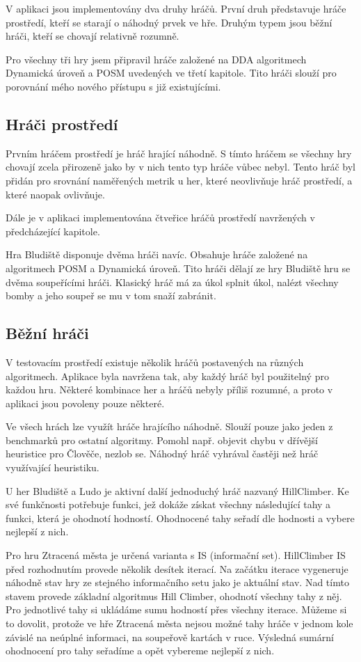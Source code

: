 V aplikaci jsou implementovány dva druhy hráčů. První druh představuje hráče prostředí, kteří se starají o náhodný prvek ve hře. Druhým typem jsou běžní hráči, kteří se chovají relativně rozumně.

Pro všechny tři hry jsem připravil hráče založené na DDA algoritmech Dynamická úroveň a POSM uvedených ve třetí kapitole. Tito hráči slouží pro porovnání mého nového přístupu s již existujícími.

\subsection{Hráči prostředí}

Prvním hráčem prostředí je hráč hrající náhodně. S tímto hráčem se všechny hry chovají zcela přirozeně jako by v nich tento typ hráče vůbec nebyl. Tento hráč byl přidán pro srovnání naměřených metrik u her, které neovlivňuje hráč prostředí, a které naopak ovlivňuje.

Dále je v aplikaci implementována čtveřice hráčů prostředí navržených v předcházející kapitole.

Hra Bludiště disponuje dvěma hráči navíc. Obsahuje hráče založené na algoritmech POSM a Dynamická úroveň. Tito hráči dělají ze hry Bludiště hru se dvěma soupeřícími hráči. Klasický hráč má za úkol splnit úkol, nalézt všechny bomby a jeho soupeř se mu v tom snaží zabránit. 

\subsection{Běžní hráči}

V testovacím prostředí existuje několik hráčů postavených na různých algoritmech. Aplikace byla navržena tak, aby každý hráč byl použitelný pro každou hru. Některé kombinace her a hráčů nebyly příliš rozumné, a proto v aplikaci jsou povoleny pouze některé.

Ve všech hrách lze využít hráče hrajícího náhodně. Slouží pouze jako jeden z benchmarků pro ostatní algoritmy. Pomohl např. objevit chybu v dřívější heuristice pro Člověče, nezlob se. Náhodný hráč vyhrával častěji než hráč využívající heuristiku.

U her Bludiště a Ludo je aktivní další jednoduchý hráč nazvaný HillClimber. Ke své funkčnosti potřebuje funkci, jež dokáže získat všechny následující tahy a funkci, která je ohodnotí hodností. Ohodnocené tahy seřadí dle hodnosti a vybere nejlepší z nich.

Pro hru Ztracená města je určená varianta s IS (informační set). HillClimber IS před rozhodnutím provede několik desítek iterací. Na začátku iterace vygeneruje náhodně stav hry ze stejného informačního setu jako je aktuální stav. Nad tímto stavem provede základní algoritmus Hill Climber, ohodnotí všechny tahy z něj. Pro jednotlivé tahy si ukládáme sumu hodností přes všechny iterace. Můžeme si to dovolit, protože ve hře Ztracená města nejsou možné tahy hráče v jednom kole závislé na neúplné informaci, na soupeřově kartách v ruce. Výsledná sumární ohodnocení pro tahy seřadíme a opět vybereme nejlepší z nich.

